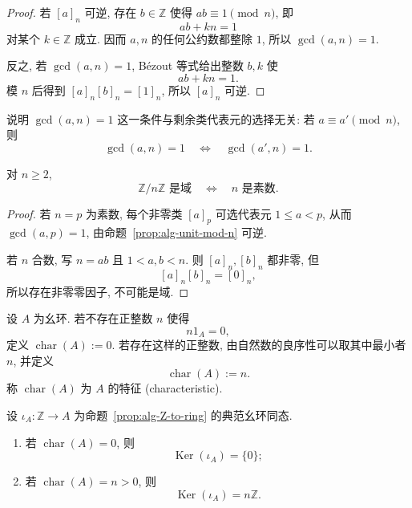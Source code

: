 \documentclass[usesamecnt, thmcnt=section, lang=cn, newtx, 10pt, scheme=chinese]{elegantbook}
\begin{document}
\begin{proof}
若 $[a]_n$ 可逆, 存在 $b\in\mathbb Z$ 使得 $ab\equiv1\pmod n$, 即
\[
 ab+kn=1
\]
对某个 $k\in\mathbb Z$ 成立. 因而 $a,n$ 的任何公约数都整除 $1$, 所以 $\gcd(a,n)=1$.

反之, 若 $\gcd(a,n)=1$, Bézout 等式给出整数 $b,k$ 使
\[
 ab+kn=1.
\]
模 $n$ 后得到 $[a]_n[b]_n=[1]_n$, 所以 $[a]_n$ 可逆.
\end{proof}

\begin{exercise}\label{ex:alg-unit-mod-representative}
说明 $\gcd(a,n)=1$ 这一条件与剩余类代表元的选择无关: 若 $a\equiv a'\pmod n$, 则
\[
 \gcd(a,n)=1\quad\Longleftrightarrow\quad\gcd(a',n)=1.
\]
\end{exercise}

\begin{corollary}\label{cor:alg-Zn-field}
对 $n\geq2$,
\[
 \mathbb Z/n\mathbb Z\text{ 是域}
 \quad\Longleftrightarrow\quad
 n\text{ 是素数}.
\]
\end{corollary}

\begin{proof}
若 $n=p$ 为素数, 每个非零类 $[a]_p$ 可选代表元 $1\leq a<p$, 从而 $\gcd(a,p)=1$, 由命题~\ref{prop:alg-unit-mod-n} 可逆.

若 $n$ 合数, 写 $n=ab$ 且 $1<a,b<n$. 则 $[a]_n,[b]_n$ 都非零, 但
\[
 [a]_n[b]_n=[0]_n,
\]
所以存在非零零因子, 不可能是域.
\end{proof}

\begin{definition}[环的特征]\label{def:alg-characteristic}
设 $A$ 为幺环. 若不存在正整数 $n$ 使得
\[
 n1_A=0,
\]
定义 $\operatorname{char}(A):=0$. 若存在这样的正整数, 由自然数的良序性可以取其中最小者 $n$, 并定义
\[
 \operatorname{char}(A):=n.
\]
称 $\operatorname{char}(A)$ 为 $A$ 的{\color{blue}特征 (characteristic)}.
\end{definition}

\begin{proposition}\label{prop:alg-characteristic-kernel}
设 $\iota_A:\mathbb Z\to A$ 为命题~\ref{prop:alg-Z-to-ring} 的典范幺环同态.
\begin{enumerate}[label=\rm(\arabic*)]
  \item 若 $\operatorname{char}(A)=0$, 则
  \[
   \operatorname{Ker}(\iota_A)=\{0\};
  \]
  \item 若 $\operatorname{char}(A)=n>0$, 则
  \[
   \operatorname{Ker}(\iota_A)=n\mathbb Z.
  \]
\end{enumerate}
\end{proposition}
\end{document}
